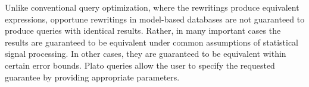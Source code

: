 Unlike conventional query optimization, where the rewritings produce equivalent expressions, opportune rewritings in model-based databases are not guaranteed to produce queries with identical results. Rather, in many important cases the results are guaranteed to be equivalent under common assumptions of statistical signal processing. In other cases, they are guaranteed to be equivalent within certain error bounds. Plato queries allow the user to specify the requested guarantee by providing appropriate parameters.



